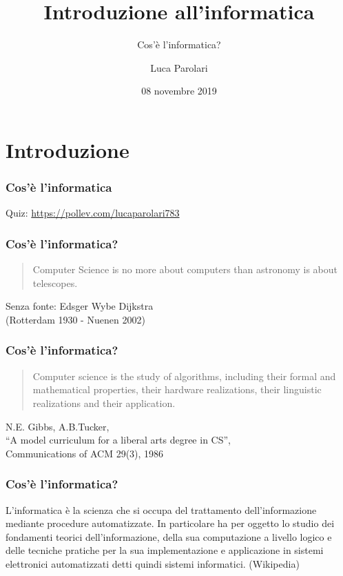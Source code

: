 \documentclass[11pt]{beamer}
\title[Introduzione]{Introduzione all'informatica}
\subtitle{Cos'è l'informatica?}
\author{Luca Parolari}
\date{08 novembre 2019}
\begin{document}
    \begin{frame}[plain]
        \maketitle
    \end{frame}
    
    \section{Introduzione}

    \begin{frame}
        \frametitle{Cos'è l'informatica}
        
        \centering
        Quiz: \href{https://pollev.com/lucaparolari783}{https://pollev.com/lucaparolari783}
    \end{frame}

    \begin{frame}
        \frametitle{Cos'è l'informatica?}
        
        \blockquote{Computer Science is no more about computers than astronomy is about telescopes.}
        
        \begin{flushright}
            Senza fonte: Edsger Wybe Dijkstra\\
            (Rotterdam 1930 - Nuenen 2002)
        \end{flushright}
    \end{frame}

    \begin{frame}
        \frametitle{Cos'è l'informatica?}
        
        \blockquote{Computer science is the study of algorithms,    including their formal and mathematical properties, their hardware realizations, their linguistic realizations and their application.}
        
        \begin{flushright}
            N.E. Gibbs, A.B.Tucker,\\ ``A model curriculum for a liberal arts degree in CS'',\\ Communications of ACM 29(3), 1986
        \end{flushright}
    
    \end{frame}

    \begin{frame}
        \frametitle{Cos'è l'informatica?}
        
        L'informatica è la scienza che si occupa del trattamento dell'informazione mediante \alert{procedure automatizzate}. In particolare ha per oggetto lo studio dei fondamenti teorici dell'informazione, della sua computazione a livello logico e delle tecniche pratiche per la sua implementazione e applicazione in sistemi elettronici automatizzati detti quindi sistemi informatici. (Wikipedia)
    \end{frame}
\end{document}

